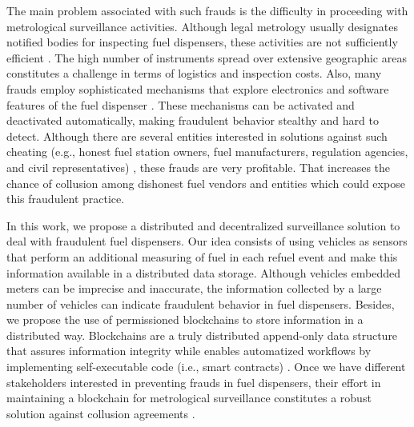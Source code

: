 \documentclass[sigplan]{acmart}
\begin{document}
The main problem associated with such frauds is the difficulty in proceeding with metrological surveillance activities.
Although legal metrology usually designates notified bodies for inspecting fuel dispensers, these activities are not sufficiently efficient \cite{MeloJr.2019}.
The high number of instruments spread over extensive geographic areas constitutes a challenge in terms of logistics and inspection costs.
Also, many frauds employ sophisticated mechanisms that explore electronics and software features of the fuel dispenser \cite{Leitao2014a}.
These mechanisms can be activated and deactivated automatically, making fraudulent behavior stealthy and hard to detect.
Although there are several entities interested in solutions against such cheating (e.g., honest fuel station owners, fuel manufacturers, regulation agencies, and civil representatives) \cite{Beteto2016,Oppermann2018}, these frauds are very profitable.
That increases the chance of collusion among dishonest fuel vendors and entities which could expose this fraudulent practice.

In this work, we propose a distributed and decentralized surveillance solution to deal with fraudulent fuel dispensers.
Our idea consists of using vehicles as sensors that perform an additional measuring of fuel in each refuel event and make this information available in a distributed data storage.
Although vehicles embedded meters can be imprecise and inaccurate, the information collected by a large number of vehicles can indicate fraudulent behavior in fuel dispensers.
Besides, we propose the use of permissioned blockchains \cite{Vukolic2016} to store information in a distributed way.
Blockchains are a truly distributed append-only data structure that assures information integrity while enables automatized workflows by implementing self-executable code (i.e., smart contracts) \cite{Christidis2016}.
Once we have different stakeholders interested in preventing frauds in fuel dispensers, their effort in maintaining a blockchain for metrological surveillance constitutes a robust solution against collusion agreements \cite{MeloJr.2019}.
\end{document}
